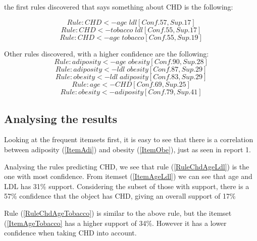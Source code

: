 the first rules discovered that says something about CHD is the following:

\begin{equation}
\label{RuleChdAgeLdl}
Rule: CHD <- age\;ldl[Conf. 57,Sup. 17]
\end{equation}
\begin{equation}
\label{RuleChdTobaccoLdl}
Rule: CHD <- tobacco\;ldl[Conf. 55,Sup. 17]
\end{equation}
\begin{equation}
\label{RuleChdAgeTobacco}
Rule: CHD <- age\;tobacco[Conf. 55,Sup. 19]
\end{equation}

Other rules discovered, with a higher confidence are the following:
\begin{equation}
\label{RuleAdiAgeOb}
Rule: adiposity <- age\;obesity[Conf. 90,Sup. 28]
\end{equation}
\begin{equation}
\label{RuleAdiLdlOb}
Rule: adiposity <- ldl\;obesity[Conf. 87,Sup. 29]
\end{equation}
\begin{equation}
\label{RuleObLdlAdi}
Rule: obesity <- ldl\;adiposity[Conf. 83,Sup. 29]
\end{equation}
\begin{equation}
\label{RuleAgeCHD}
Rule: age <- CHD[Conf. 69,Sup. 25]
\end{equation}
\begin{equation}
\label{RuleObeAdi}
Rule: obesity <- adiposity[Conf. 79,Sup. 41]
\end{equation}


\subsection{Analysing the results}
Looking at the frequent itemsets first, it is easy to see that there is a correlation between adiposity (\ref{ItemAdi}) and obesity (\ref{ItemObe}), just as seen in report 1. 

Analysing the rules predicting CHD, we see that rule (\ref{RuleChdAgeLdl}) is the one with most confidence. 
From itemset (\ref{ItemAgeLdl}) we can see that age and LDL has 31\% support. Considering the subset of those with support, there is a 57\% confidence that the object has CHD, giving an overall support of 17\%


Rule (\ref{RuleChdAgeTobacco}) is similar to the above rule, but the itemset (\ref{ItemAgeTobacco} has a higher support of 34\%. However it has a lower confidence when taking CHD into account.

